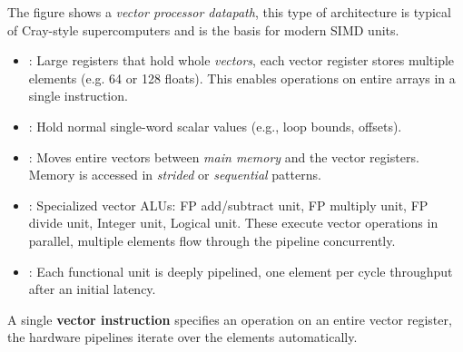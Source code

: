 \highspace
The figure shows a \emph{vector processor datapath}, this type of architecture is typical of Cray-style supercomputers and is the basis for modern SIMD units.
\begin{itemize}
    \item {}: Large registers that hold whole \emph{vectors}, each vector register stores multiple elements (e.g. 64 or 128 floats). This enables operations on entire arrays in a single instruction.
    \item {}: Hold normal single-word scalar values (e.g., loop bounds, offsets).
    \item {}: Moves entire vectors between \emph{main memory} and the vector registers. Memory is accessed in \emph{strided} or \emph{sequential} patterns.
    \item {}: Specialized vector ALUs: FP add/subtract unit, FP multiply unit, FP divide unit, Integer unit, Logical unit. These execute vector operations in parallel, multiple elements flow through the pipeline concurrently.
    \item {}: Each functional unit is deeply pipelined, one element per cycle throughput after an initial latency.
\end{itemize}
A single \textbf{vector instruction} specifies an operation on an entire vector register, the hardware pipelines iterate over the elements automatically.

